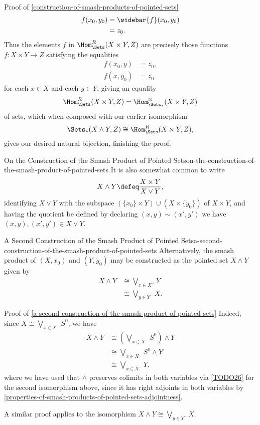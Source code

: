\begin{Proof}{Proof of \cref{construction-of-smash-products-of-pointed-sets}}
    \begin{align*}
        f(x_{0},y_{0}) &= \widebar{f}(x_{0},y_{0})\\
                       &= z_{0}.
    \end{align*}
    Thus the elements $f$ in $\Hom^{R}_{\Sets}(X\times Y,Z)$ are precisely those functions $f\colon X\times Y\to Z$ satisfying the equalities
    \begin{align*}
        f(x_{0},y) &= z_{0},\\
        f(x,y_{0}) &= z_{0}
    \end{align*}
    for each $x\in X$ and each $y\in Y$, giving an equality
    \[
        \Hom^{R}_{\Sets}(X\times Y,Z)%
        =%
        \Hom^{\otimes}_{\Sets_{*}}(X\times Y,Z)%
    \]%
    of sets, which when composed with our earlier isomorphism
    \[
        \Sets_{*}(X\wedge Y,Z)
        \cong
        \Hom^{R}_{\Sets}(X\times Y,Z),%
    \]%
    gives our desired natural bijection, finishing the proof.
\end{Proof}
\begin{remark}{On the Construction of the Smash Product of Pointed Sets}{on-the-construction-of-the-smash-product-of-pointed-sets}%
    It is also somewhat common to write
    \[
        X\wedge Y%
        \defeq%
        \frac{X\times Y}{X\vee Y},%
    \]%
    identifying $X\vee Y$ with the subspace $(\{x_{0}\}\times Y)\cup(X\times\{y_{0}\})$ of $X\times Y$, and having the quotient be defined by declaring $(x,y)\sim(x',y')$ \textiff we have $(x,y),(x',y')\in X\vee Y$.
\end{remark}
\begin{construction}{A Second Construction of the Smash Product of Pointed Sets}{a-second-construction-of-the-smash-product-of-pointed-sets}%
    Alternatively, the smash product of $(X,x_{0})$ and $(Y,y_{0})$ may be constructed as the pointed set $X\wedge Y$ given by
    \begin{align*}
        X\wedge Y &\cong \bigvee_{x\in X^{-}}Y\\%
                  &\cong \bigvee_{y\in Y^{-}}X.%
    \end{align*}
\end{construction}
\begin{Proof}{Proof of \cref{a-second-construction-of-the-smash-product-of-pointed-sets}}%
    Indeed, since $X\cong\bigvee_{x\in X^{-}}S^{0}$, we have
    \begin{align*}
        X\wedge Y &\cong (\bigvee_{x\in X^{-}}S^{0})\wedge Y\\
                  &\cong \bigvee_{x\in X^{-}}S^{0}\wedge Y\\
                  &\cong \bigvee_{x\in X^{-}}Y,
    \end{align*}
    where we have used that $\wedge$ preserves colimits in both variables via \cref{TODO26} for the second isomorphism above, since it has right adjoints in both variables by \cref{properties-of-smash-products-of-pointed-sets-adjointness}.

    A similar proof applies to the isomorphism $X\wedge Y\cong\bigvee_{y\in Y^{-}}X$.
\end{Proof}
